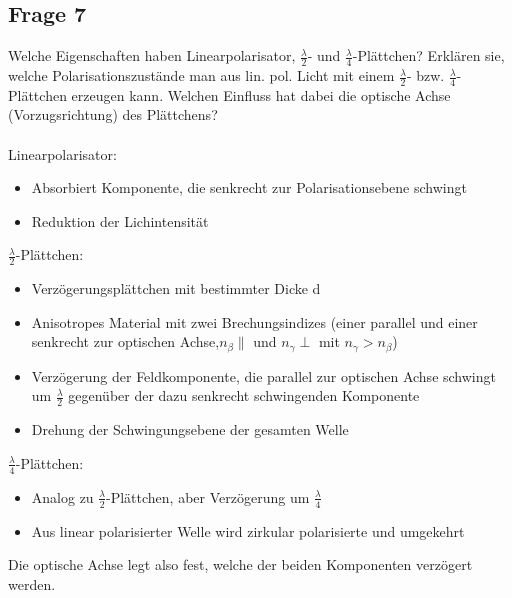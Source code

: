 \documentclass[a4paper,10pt]{scrartcl}
\begin{document}
		\subsection{Frage 7}
			Welche Eigenschaften haben Linearpolarisator, \(\frac{\lambda}{2}\)- und \(\frac{\lambda}{4}\)-Plättchen? Erklären sie, welche
			Polarisationszustände man aus lin. pol. Licht mit einem \(\frac{\lambda}{2}\)- bzw. \(\frac{\lambda}{4}\)-Plättchen erzeugen kann.
			Welchen Einfluss hat dabei die optische Achse (Vorzugsrichtung) des Plättchens?\\
			\\
			Linearpolarisator:
			\begin{itemize}
				\item Absorbiert Komponente, die senkrecht zur Polarisationsebene schwingt
				\item Reduktion der Lichintensität
			\end{itemize}
			
			\(\frac{\lambda}{2}\)-Plättchen:
			\begin{itemize}
				\item Verzögerungsplättchen mit bestimmter Dicke d
				\item Anisotropes Material mit zwei Brechungsindizes (einer parallel und einer senkrecht zur optischen Achse,\(n_{\beta}\parallel\) und \(n_{\gamma}\perp\) mit \(n_{\gamma}>n_{\beta}\))
				\item Verzögerung der Feldkomponente, die parallel zur optischen Achse schwingt um \(\frac{\lambda}{2}\) gegenüber der dazu senkrecht schwingenden Komponente
				\item Drehung der Schwingungsebene der gesamten Welle
			\end{itemize}
		
			\(\frac{\lambda}{4}\)-Plättchen:
			\begin{itemize}
				\item Analog zu \(\frac{\lambda}{2}\)-Plättchen, aber Verzögerung um \(\frac{\lambda}{4}\)
				\item Aus linear polarisierter Welle wird zirkular polarisierte und umgekehrt
			\end{itemize}
		
			Die optische Achse legt also fest, welche der beiden Komponenten verzögert werden.
			
\end{document}
